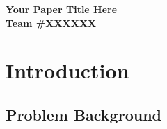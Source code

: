 \documentclass[12pt, letterpaper]{article}
\begin{document}

\begin{center}
    {\Large\bfseries Your Paper Title Here}\\[6pt]

    \textbf{Team \#XXXXXX}
\end{center}

\begin{abstract}
%

This paper addresses \dots We propose a \dots model combining
\dots Our results show that \dots We validate the model via
\dots and find it is robust to \dots but sensitive to \dots
Overall, our approach suggests that \dots

\textbf{Keywords:} keyword one; keyword two; keyword three
\end{abstract}

\newpage
\tableofcontents
\newpage

\section{Introduction}

\subsection{Problem Background}
\end{document}
